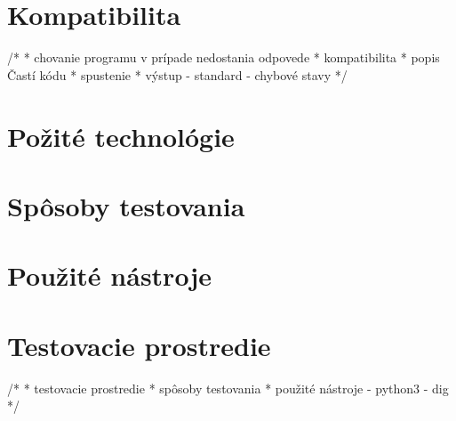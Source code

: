 \section{Kompatibilita}
\label{Kompatibilita}
/*
 * chovanie programu v prípade nedostania odpovede
 * kompatibilita
 * popis Častí kódu 
 * spustenie
 * výstup   - standard
            - chybové stavy
 */

\section{Požité technológie}
\label{Použité technológie}




\section{Spôsoby testovania}
\label{Spôsoby testovania}

\section{Použité nástroje}
\label{Použité nástroje}

\section{Testovacie prostredie}
\label{Testovacaie prostrede}

/*
 * testovacie prostredie
 * spôsoby testovania
 * použité nástroje - python3
                    - dig 
 */



